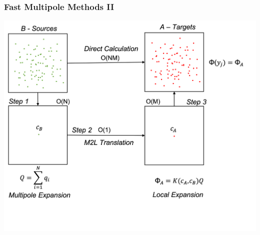 \begin{frame}
    \frametitle{Fast Multipole Methods II }
    \includegraphics[width=\linewidth]{assets/three_step.png}
\end{frame}







